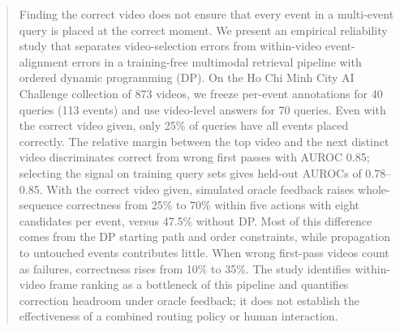 \begin{abstract}
Finding the correct video does not ensure that every event in a multi-event query is placed at the correct moment.
We present an empirical reliability study that separates video-selection errors from within-video event-alignment errors in a training-free multimodal retrieval pipeline with ordered dynamic programming (DP).
On the Ho Chi Minh City AI Challenge collection of 873 videos, we freeze per-event annotations for 40 queries (113 events) and use video-level answers for 70 queries.
Even with the correct video given, only 25\% of queries have all events placed correctly.
The relative margin between the top video and the next distinct video discriminates correct from wrong first passes with AUROC 0.85; selecting the signal on training query sets gives held-out AUROCs of 0.78--0.85.
With the correct video given, simulated oracle feedback raises whole-sequence correctness from 25\% to 70\% within five actions with eight candidates per event, versus 47.5\% without DP.
Most of this difference comes from the DP starting path and order constraints, while propagation to untouched events contributes little.
When wrong first-pass videos count as failures, correctness rises from 10\% to 35\%.
The study identifies within-video frame ranking as a bottleneck of this pipeline and quantifies correction headroom under oracle feedback; it does not establish the effectiveness of a combined routing policy or human interaction.
\end{abstract}
